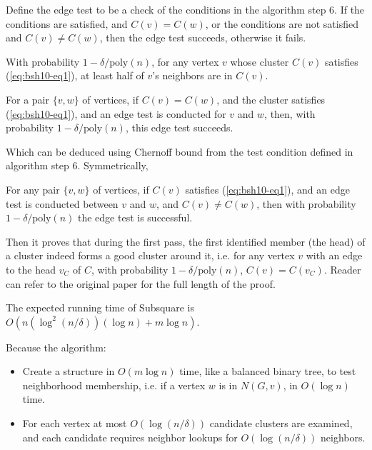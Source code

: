 {	Define the edge test to be a check of the conditions in the algorithm step 6. If the conditions are satisfied, and $C(v)=C(w)$, or the conditions are not satisfied and $C(v) \neq C(w)$, then the edge test succeeds, otherwise it fails.
	
	\begin{lemma}
		With probability $1-\delta/\mathrm{poly}(n)$, for any vertex $v$ whose cluster $C(v)$ satisfies (\ref{eq:bsh10-eq1}), at least half of $v$’s neighbors are in $C(v)$.
	\end{lemma}
	
	\begin{lemma}
		For a pair $\{ v, w \}$ of vertices, if $C(v) = C(w)$, and the cluster satisfies (\ref{eq:bsh10-eq1}), and an edge test is conducted for $v$ and $w$, then, with probability $1-\delta/\mathrm{poly}(n)$, this edge test succeeds.
	\end{lemma}
	
	Which can be deduced using Chernoff bound from the test condition defined in algorithm step 6. Symmetrically,
	
	\begin{lemma}
		For any pair $\{ v, w \}$ of vertices, if $C(v)$ satisfies (\ref{eq:bsh10-eq1}), and an edge test is conducted between $v$ and $w$, and $C(v) \neq C(w)$, then with probability $1-\delta/\mathrm{poly}(n)$ the edge test is successful.
	\end{lemma}
	
	Then it proves that during the first pass, the first identified member (the head) of a cluster indeed forms a good cluster around it, i.e. for any vertex $v$ with an edge to the head $v_C$ of $C$, with probability $1-\delta/\mathrm{poly}(n)$, $C(v) = C(v_C)$. Reader can refer to the original paper for the full length of the proof.
	
	\begin{theorem}
		The expected running time of Subsquare is $O(n(\log ^{2}(n / \delta))(\log n)+m \log n)$.
	\end{theorem}
	
	Because the algorithm:
	
	\begin{itemize}
		\item Create a structure in $O(m \log n)$ time, like a balanced binary tree, to test neighborhood membership, i.e. if a vertex $w$ is in $N(G,v)$, in $O(\log n)$ time.
		\item For each vertex at most $O(\log(n/\delta))$ candidate clusters are examined, and each candidate requires neighbor lookups for $O(\log(n/\delta))$ neighbors.
	\end{itemize}
	
}
